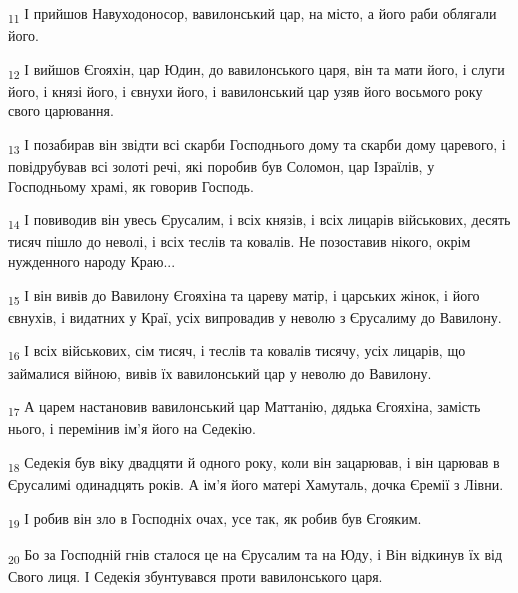 \begin{tcolorbox}
\textsubscript{11} І прийшов Навуходоносор, вавилонський цар, на місто, а його раби облягали його.
\end{tcolorbox}
\begin{tcolorbox}
\textsubscript{12} І вийшов Єгояхін, цар Юдин, до вавилонського царя, він та мати його, і слуги його, і князі його, і євнухи його, і вавилонський цар узяв його восьмого року свого царювання.
\end{tcolorbox}
\begin{tcolorbox}
\textsubscript{13} І позабирав він звідти всі скарби Господнього дому та скарби дому царевого, і повідрубував всі золоті речі, які поробив був Соломон, цар Ізраїлів, у Господньому храмі, як говорив Господь.
\end{tcolorbox}
\begin{tcolorbox}
\textsubscript{14} І повиводив він увесь Єрусалим, і всіх князів, і всіх лицарів військових, десять тисяч пішло до неволі, і всіх теслів та ковалів. Не позоставив нікого, окрім нужденного народу Краю...
\end{tcolorbox}
\begin{tcolorbox}
\textsubscript{15} І він вивів до Вавилону Єгояхіна та цареву матір, і царських жінок, і його євнухів, і видатних у Краї, усіх випровадив у неволю з Єрусалиму до Вавилону.
\end{tcolorbox}
\begin{tcolorbox}
\textsubscript{16} І всіх військових, сім тисяч, і теслів та ковалів тисячу, усіх лицарів, що займалися війною, вивів їх вавилонський цар у неволю до Вавилону.
\end{tcolorbox}
\begin{tcolorbox}
\textsubscript{17} А царем настановив вавилонський цар Маттанію, дядька Єгояхіна, замість нього, і перемінив ім'я його на Седекію.
\end{tcolorbox}
\begin{tcolorbox}
\textsubscript{18} Седекія був віку двадцяти й одного року, коли він зацарював, і він царював в Єрусалимі одинадцять років. А ім'я його матері Хамуталь, дочка Єремії з Лівни.
\end{tcolorbox}
\begin{tcolorbox}
\textsubscript{19} І робив він зло в Господніх очах, усе так, як робив був Єгояким.
\end{tcolorbox}
\begin{tcolorbox}
\textsubscript{20} Бо за Господній гнів сталося це на Єрусалим та на Юду, і Він відкинув їх від Свого лиця. І Седекія збунтувався проти вавилонського царя.
\end{tcolorbox}
